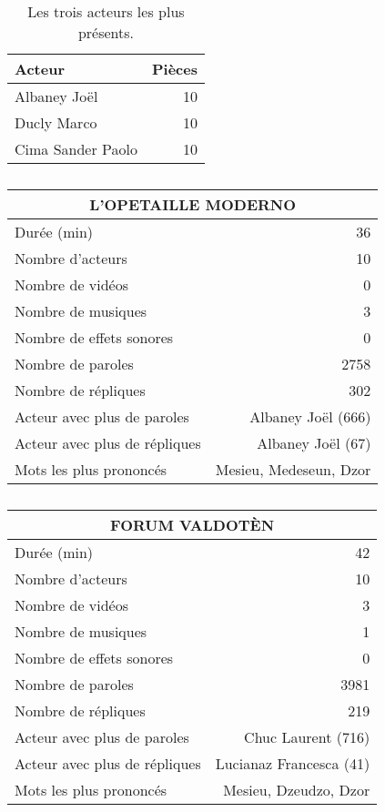 \begin{table}[]
\centering
\caption{Les trois acteurs les plus présents.}
\begin{tabular}{lr}
    \toprule
\multicolumn{1}{l}{\textbf{Acteur}} & \textbf{Pièces} \\
    \midrule
\multicolumn{1}{l}{Albaney Joël} &10\\
\multicolumn{1}{l}{Ducly Marco} &10\\
\multicolumn{1}{l}{Cima Sander Paolo} &10\\
\bottomrule
\end{tabular}%
\end{table}
\newpage
    \begin{table}[]
    \centering
    \caption{}
    \begin{tabular}{lr}\toprule\multicolumn{2}{c}{L’OPETAILLE MODERNO} \\\midrule
\multicolumn{1}{l}{Durée (min)}&36\\
\multicolumn{1}{l}{Nombre d'acteurs}&10\\
\multicolumn{1}{l}{Nombre de vidéos}&0\\
\multicolumn{1}{l}{Nombre de musiques}&3\\
\multicolumn{1}{l}{Nombre de effets sonores}&0\\
\multicolumn{1}{l}{Nombre de paroles}&2758\\
\multicolumn{1}{l}{Nombre de répliques}&302\\
\multicolumn{1}{l}{Acteur avec plus de paroles}&Albaney Joël (666)\\
\multicolumn{1}{l}{Acteur avec plus de répliques}&Albaney Joël (67)\\
\multicolumn{1}{l}{Mots les plus prononcés}&Mesieu, Medeseun, Dzor\\
    \bottomrule
    \end{tabular}%
    \end{table}
    \begin{table}[]
    \centering
    \caption{}
    \begin{tabular}{lr}\toprule\multicolumn{2}{c}{FORUM VALDOTÈN} \\\midrule
\multicolumn{1}{l}{Durée (min)}&42\\
\multicolumn{1}{l}{Nombre d'acteurs}&10\\
\multicolumn{1}{l}{Nombre de vidéos}&3\\
\multicolumn{1}{l}{Nombre de musiques}&1\\
\multicolumn{1}{l}{Nombre de effets sonores}&0\\
\multicolumn{1}{l}{Nombre de paroles}&3981\\
\multicolumn{1}{l}{Nombre de répliques}&219\\
\multicolumn{1}{l}{Acteur avec plus de paroles}&Chuc Laurent (716)\\
\multicolumn{1}{l}{Acteur avec plus de répliques}&Lucianaz Francesca (41)\\
\multicolumn{1}{l}{Mots les plus prononcés}&Mesieu, Dzeudzo, Dzor\\
    \bottomrule
    \end{tabular}%
    \end{table}
